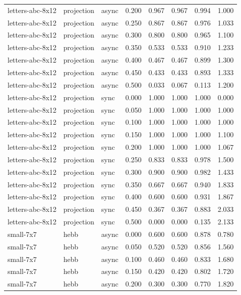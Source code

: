 \begin{tabular}{lllrrrrr}
letters-abc-8x12 & projection & async & 0.200 & 0.967 & 0.967 & 0.994 & 1.000 \\
letters-abc-8x12 & projection & async & 0.250 & 0.867 & 0.867 & 0.976 & 1.033 \\
letters-abc-8x12 & projection & async & 0.300 & 0.800 & 0.800 & 0.965 & 1.100 \\
letters-abc-8x12 & projection & async & 0.350 & 0.533 & 0.533 & 0.910 & 1.233 \\
letters-abc-8x12 & projection & async & 0.400 & 0.467 & 0.467 & 0.899 & 1.300 \\
letters-abc-8x12 & projection & async & 0.450 & 0.433 & 0.433 & 0.893 & 1.333 \\
letters-abc-8x12 & projection & async & 0.500 & 0.033 & 0.067 & 0.113 & 1.200 \\
letters-abc-8x12 & projection & sync & 0.000 & 1.000 & 1.000 & 1.000 & 0.000 \\
letters-abc-8x12 & projection & sync & 0.050 & 1.000 & 1.000 & 1.000 & 1.000 \\
letters-abc-8x12 & projection & sync & 0.100 & 1.000 & 1.000 & 1.000 & 1.000 \\
letters-abc-8x12 & projection & sync & 0.150 & 1.000 & 1.000 & 1.000 & 1.100 \\
letters-abc-8x12 & projection & sync & 0.200 & 1.000 & 1.000 & 1.000 & 1.067 \\
letters-abc-8x12 & projection & sync & 0.250 & 0.833 & 0.833 & 0.978 & 1.500 \\
letters-abc-8x12 & projection & sync & 0.300 & 0.900 & 0.900 & 0.982 & 1.433 \\
letters-abc-8x12 & projection & sync & 0.350 & 0.667 & 0.667 & 0.940 & 1.833 \\
letters-abc-8x12 & projection & sync & 0.400 & 0.600 & 0.600 & 0.931 & 1.867 \\
letters-abc-8x12 & projection & sync & 0.450 & 0.367 & 0.367 & 0.883 & 2.033 \\
letters-abc-8x12 & projection & sync & 0.500 & 0.000 & 0.000 & 0.135 & 2.133 \\
small-7x7 & hebb & async & 0.000 & 0.600 & 0.600 & 0.878 & 0.780 \\
small-7x7 & hebb & async & 0.050 & 0.520 & 0.520 & 0.856 & 1.560 \\
small-7x7 & hebb & async & 0.100 & 0.460 & 0.460 & 0.833 & 1.680 \\
small-7x7 & hebb & async & 0.150 & 0.420 & 0.420 & 0.802 & 1.720 \\
small-7x7 & hebb & async & 0.200 & 0.300 & 0.300 & 0.770 & 1.820 \\

\end{tabular}
